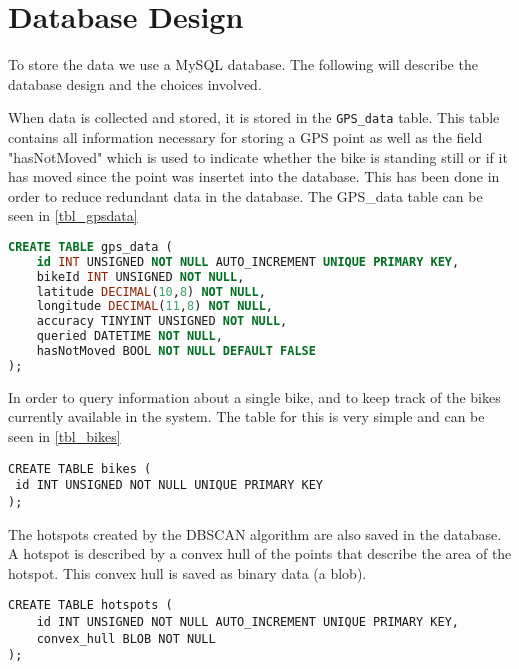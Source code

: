 \section{Database Design}\label{database_design}
To store the data we use a MySQL database.
The following will describe the database design and the choices involved.

When data is collected and stored, it is stored in the \texttt{GPS\_data} table.
This table contains all information necessary for storing a GPS point as well as the field "hasNotMoved" which is used to indicate whether the bike is standing still or if it has moved since the point was insertet into the database.
This has been done in order to reduce redundant data in the database.
The GPS\_data table can be seen in \cref{tbl_gpsdata}

\begin{lstlisting}[caption=Table for GPS\_data, label=tbl_gpsdata, language=SQL]
CREATE TABLE gps_data (
	id INT UNSIGNED NOT NULL AUTO_INCREMENT UNIQUE PRIMARY KEY,
	bikeId INT UNSIGNED NOT NULL,
	latitude DECIMAL(10,8) NOT NULL,
	longitude DECIMAL(11,8) NOT NULL,
	accuracy TINYINT UNSIGNED NOT NULL,
	queried DATETIME NOT NULL,
	hasNotMoved BOOL NOT NULL DEFAULT FALSE
);
\end{lstlisting}

In order to query information about a single bike, and to keep track of the bikes currently available in the system.
The table for this is very simple and can be seen in \cref{tbl_bikes}

\begin{lstlisting}[caption=Table for bikes, label=tbl_bikes]
CREATE TABLE bikes (
 id INT UNSIGNED NOT NULL UNIQUE PRIMARY KEY
);

\end{lstlisting}

The hotspots created by the DBSCAN algorithm are also saved in the database.
A hotspot is described by a convex hull of the points that describe the area of the hotspot.
This convex hull is saved as binary data (a blob).

\begin{lstlisting}[caption=Table for hotspots, label=tbl]
CREATE TABLE hotspots (
	id INT UNSIGNED NOT NULL AUTO_INCREMENT UNIQUE PRIMARY KEY,
	convex_hull BLOB NOT NULL
);
\end{lstlisting}
